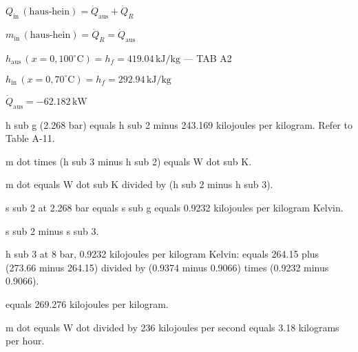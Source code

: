 \( Q_{\text{in}} \, (\text{haus-hein}) = \dot{Q}_{\text{aus}} + \dot{Q}_R \)  

\( m_{\text{in}} \, (\text{haus-hein}) = \dot{Q}_R = \dot{Q}_{\text{aus}} \)  

\( h_{\text{aus}} \, (x = 0, 100^\circ \text{C}) = h_f = 419.04 \, \text{kJ/kg} \) — TAB A2  

\( h_{\text{in}} \, (x = 0, 70^\circ \text{C}) = h_f = 292.94 \, \text{kJ/kg} \)  

\( \dot{Q}_{\text{aus}} = -62.182 \, \text{kW} \)

h sub g (2.268 bar) equals h sub 2 minus 243.169 kilojoules per kilogram. Refer to Table A-11.  

m dot times (h sub 3 minus h sub 2) equals W dot sub K.  

m dot equals W dot sub K divided by (h sub 2 minus h sub 3).  

s sub 2 at 2.268 bar equals s sub g equals 0.9232 kilojoules per kilogram Kelvin.  

s sub 2 minus s sub 3.  

h sub 3 at 8 bar, 0.9232 kilojoules per kilogram Kelvin:  
equals 264.15 plus (273.66 minus 264.15) divided by (0.9374 minus 0.9066) times (0.9232 minus 0.9066).  

equals 269.276 kilojoules per kilogram.  

m dot equals W dot divided by 236 kilojoules per second equals 3.18 kilograms per hour.